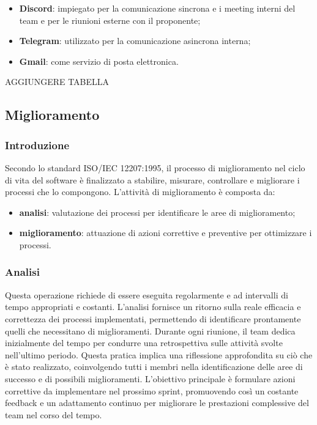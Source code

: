 \begin{itemize}
	\item \textbf{Discord}: impiegato per la comunicazione sincrona e i meeting interni del team e per le riunioni esterne con il proponente;
	\item \textbf{Telegram}: utilizzato per la comunicazione asincrona interna;
	\item \textbf{Gmail}: come servizio di posta elettronica.
\end{itemize}

AGGIUNGERE TABELLA

\subsection{Miglioramento}
\subsubsection{Introduzione}
Secondo lo standard ISO/IEC 12207:1995, il processo di miglioramento nel ciclo di vita del software è finalizzato a stabilire, misurare, controllare e migliorare i processi che lo compongono. L’attività di miglioramento è composta da:
\begin{itemize}
	\item \textbf{analisi}: valutazione dei processi per identificare le aree di miglioramento;
	\item \textbf{miglioramento}: attuazione di azioni correttive e preventive per ottimizzare i processi.
\end{itemize}
\subsubsection{Analisi}
Questa operazione richiede di essere eseguita regolarmente e ad intervalli di tempo appropriati e costanti. L’analisi fornisce un ritorno sulla reale efficacia e correttezza dei processi implementati, permettendo di identificare prontamente quelli che necessitano di miglioramenti.
Durante ogni riunione, il team dedica inizialmente del tempo per condurre una retrospettiva sulle attività svolte nell’ultimo periodo. Questa pratica implica una riflessione approfondita su ciò che è stato realizzato, coinvolgendo tutti i membri nella identificazione delle aree di successo e di possibili miglioramenti.
L’obiettivo principale è formulare azioni correttive da implementare nel prossimo sprint, promuovendo così un costante feedback e un adattamento continuo per migliorare le prestazioni complessive del team nel corso del tempo.
